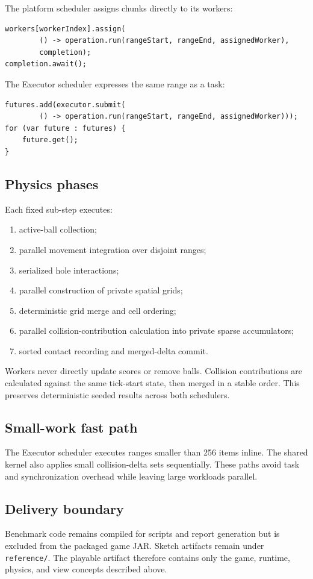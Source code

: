 The platform scheduler assigns chunks directly to its workers:

\begin{lstlisting}[style=codestyle,caption={Platform-thread range dispatch},label={lst:platform-range-dispatch}]
workers[workerIndex].assign(
        () -> operation.run(rangeStart, rangeEnd, assignedWorker),
        completion);
completion.await();
\end{lstlisting}

The Executor scheduler expresses the same range as a task:

\begin{lstlisting}[style=codestyle,caption={Executor range dispatch},label={lst:executor-range-dispatch}]
futures.add(executor.submit(
        () -> operation.run(rangeStart, rangeEnd, assignedWorker)));
for (var future : futures) {
    future.get();
}
\end{lstlisting}

\subsection{Physics phases}

Each fixed sub-step executes:

\begin{enumerate}
    \item active-ball collection;
    \item parallel movement integration over disjoint ranges;
    \item serialized hole interactions;
    \item parallel construction of private spatial grids;
    \item deterministic grid merge and cell ordering;
    \item parallel collision-contribution calculation into private sparse accumulators;
    \item sorted contact recording and merged-delta commit.
\end{enumerate}

Workers never directly update scores or remove balls.
Collision contributions are calculated against the same tick-start state, then merged in a stable order.
This preserves deterministic seeded results across both schedulers.

\subsection{Small-work fast path}

The Executor scheduler executes ranges smaller than 256 items inline.
The shared kernel also applies small collision-delta sets sequentially.
These paths avoid task and synchronization overhead while leaving large workloads parallel.

\subsection{Delivery boundary}

Benchmark code remains compiled for scripts and report generation but is excluded from the packaged game JAR.
Sketch artifacts remain under \texttt{reference/}.
The playable artifact therefore contains only the game, runtime, physics, and view concepts described above.
